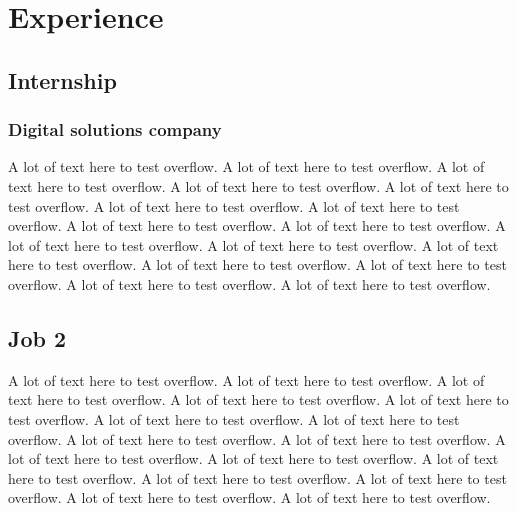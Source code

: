 \documentclass[a4paper,9pt]{article}
\begin{document}
\begin{minipage}[t]{0.61\textwidth}
{\color{blue}\section*{Experience}}
\vspace{-1.0mm}
\subsection*{Internship}
\vspace{-1.2mm}
\subsubsection*{Digital solutions company}
A lot of text here to test overflow. A lot of text here to test overflow. A lot of text here to test overflow. A lot of text here to test overflow. A lot of text here to test overflow. A lot of text here to test overflow. A lot of text here to test overflow. A lot of text here to test overflow.
A lot of text here to test overflow. A lot of text here to test overflow. A lot of text here to test overflow. A lot of text here to test overflow. A lot of text here to test overflow. A lot of text here to test overflow. A lot of text here to test overflow. A lot of text here to test overflow.
\subsection*{Job 2}
\vspace{-1.2mm}
A lot of text here to test overflow. A lot of text here to test overflow. A lot of text here to test overflow. A lot of text here to test overflow. A lot of text here to test overflow. A lot of text here to test overflow. A lot of text here to test overflow. A lot of text here to test overflow.
A lot of text here to test overflow. A lot of text here to test overflow. A lot of text here to test overflow. A lot of text here to test overflow. A lot of text here to test overflow. A lot of text here to test overflow. A lot of text here to test overflow. A lot of text here to test overflow.
\end{minipage} \hfill %
\end{document}
